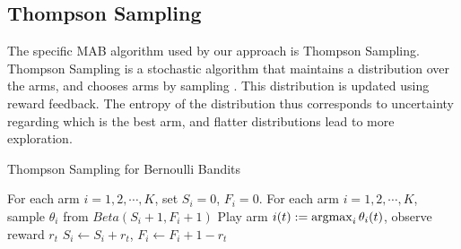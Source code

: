 \subsection{Thompson Sampling}
\label{sec:ts}

The specific MAB algorithm used by our \selfsparring approach is Thompson Sampling.
Thompson Sampling is a stochastic algorithm that maintains a distribution over the arms, and chooses arms by sampling  \citep{chapelle2011empirical}. This distribution is updated using reward feedback.  The entropy of the distribution thus corresponds to  uncertainty regarding which is the best arm, and flatter distributions lead to more exploration.

\newcommand{\muh}{\hat{\mu}}

\begin{algorithm}[t]
    \caption{Thompson Sampling for Bernoulli Bandits}
    \label{alg:ts}
{
\begin{algorithmic}[1]
	\STATE For each arm $i=1,2,\cdots, K$, set $S_i=0$, $F_i=0$.
    	\STATE For each arm $i=1,2,\cdots, K$, sample $\theta_{i}$ from $Beta(S_i+1,F_i+1)$
        \STATE Play arm $i(t) := \argmax_i{\theta_i(t)}$, observe reward $r_t$
        \STATE $S_i \leftarrow S_i + r_t$, $F_i \leftarrow F_i + 1 - r_t$
    \ENDFOR
\end{algorithmic}
}
\end{algorithm}

